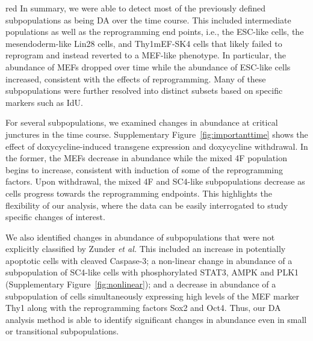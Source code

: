 \documentclass{article}
\begin{document}
\begin{color}{red}
In summary, we were able to detect most of the previously defined subpopulations as being DA over the time course.
This included intermediate populations as well as the reprogramming end points, i.e., the ESC-like cells, the mesendoderm-like Lin28\hi{} cells, and Thy1\hi{}mEF-SK4\hi{} cells that likely failed to reprogram and instead reverted to a MEF-like phenotype.
In particular, the abundance of MEFs dropped over time while the abundance of ESC-like cells increased, consistent with the effects of reprogramming.
Many of these subpopulations were further resolved into distinct subsets based on specific markers such as IdU.

For several subpopulations, we examined changes in abundance at critical junctures in the time course.
Supplementary Figure~\ref{fig:importanttime} shows the effect of doxycycline-induced transgene expression and doxycycline withdrawal.
In the former, the MEFs decrease in abundance while the mixed 4F population begins to increase, consistent with induction of some of the reprogramming factors.
Upon withdrawal, the mixed 4F and SC4-like subpopulations decrease as cells progress towards the reprogramming endpoints.
This highlights the flexibility of our analysis, where the data can be easily interrogated to study specific changes of interest.

We also identified changes in abundance of subpopulations that were not explicitly classified by Zunder \emph{et al.}
This included an increase in potentially apoptotic cells with cleaved Caspase-3;
a non-linear change in abundance of a subpopulation of SC4-like cells with phosphorylated STAT3, AMPK and PLK1 (Supplementary Figure~\ref{fig:nonlinear});
and a decrease in abundance of a subpopulation of cells simultaneously expressing high levels of the MEF marker Thy1 along with the reprogramming factors Sox2 and Oct4.
Thus, our DA analysis method is able to identify significant changes in abundance even in small or transitional subpopulations.


\end{color}
\end{document}
